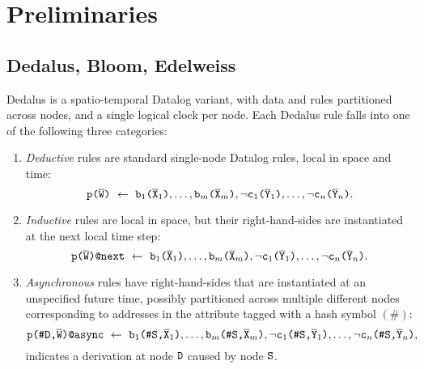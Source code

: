 
\section{Preliminaries}
\label{sec:prelims}

\subsection{Dedalus, Bloom, Edelweiss}
Dedalus is a spatio-temporal Datalog variant, with data and rules partitioned across nodes, and a single logical clock per node. Each Dedalus rule falls into one of the following three categories:
\begin{enumerate}
\item \emph{Deductive} rules are standard single-node Datalog rules, local in space and time:
  \[\tt{p(}\overline{\tt{W}}\tt{)} ~\leftarrow~ \tt{b}_1\tt{(}\overline{\tt{X}}_1\tt{)}, \dots, \tt{b}_m\tt{(}\overline{\tt{X}}_m\tt{)}, \neg\tt{c}_1\tt{(}\overline{\tt{Y}}_1\tt{)}, \dots, \neg\tt{c}_n\tt{(}\overline{\tt{Y}}_n\tt{)}.\]
\item \emph{Inductive} rules are local in space, but their right-hand-sides are instantiated at the next local time step:
  \[\tt{p(}\overline{\tt{W}}\tt{)@next} ~\leftarrow~ \tt{b}_1\tt{(}\overline{\tt{X}}_1\tt{)}, \dots, \tt{b}_m\tt{(}\overline{\tt{X}}_m\tt{)}, \neg\tt{c}_1\tt{(}\overline{\tt{Y}}_1\tt{)}, \dots, \neg\tt{c}_n\tt{(}\overline{\tt{Y}}_n\tt{)}.\]
\item \emph{Asynchronous} rules have right-hand-sides that are instantiated at an unspecified future time, possibly partitioned across multiple different nodes corresponding to addresses in the attribute tagged with a hash symbol $(\#)$:
  \[\tt{p(\#D,}\overline{\tt{W}}\tt{)@async} ~\leftarrow~ \tt{b}_1\tt{(\#S,}\overline{\tt{X}}_1\tt{)}, \dots, \tt{b}_m\tt{(\#S,}\overline{\tt{X}}_m\tt{)}, \neg\tt{c}_1\tt{(\#S,}\overline{\tt{Y}}_1\tt{)}, \dots, \neg\tt{c}_n\tt{(\#S,}\overline{\tt{Y}}_n\tt{)},\]
indicates a derivation at node $\tt{D}$ caused by node $\tt{S}$.
\end{enumerate}

